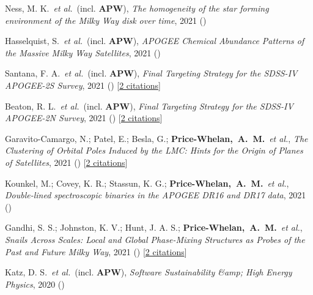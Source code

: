 \item[{\color{deemph}\scriptsize16}]Ness, M. K.~\textit{et al.}~(incl. \textbf{APW}), \textit{The homogeneity of the star forming environment of the Milky Way disk over time}, 2021 ()

\item[{\color{deemph}\scriptsize15}]Hasselquist, S.~\textit{et al.}~(incl. \textbf{APW}), \textit{APOGEE Chemical Abundance Patterns of the Massive Milky Way Satellites}, 2021 ()

\item[{\color{deemph}\scriptsize14}]Santana, F. A.~\textit{et al.}~(incl. \textbf{APW}), \textit{Final Targeting Strategy for the SDSS-IV APOGEE-2S Survey}, 2021 () [\href{http://adsabs.harvard.edu/abs/2021arXiv210811908S}{2 citations}]

\item[{\color{deemph}\scriptsize13}]Beaton, R. L.~\textit{et al.}~(incl. \textbf{APW}), \textit{Final Targeting Strategy for the SDSS-IV APOGEE-2N Survey}, 2021 () [\href{http://adsabs.harvard.edu/abs/2021arXiv210811907B}{2 citations}]

\item[{\color{deemph}\scriptsize12}]Garavito-Camargo, N.; Patel, E.; Besla, G.; \textbf{Price-Whelan,~A.~M.}~\textit{et al.}, \textit{The Clustering of Orbital Poles Induced by the LMC: Hints for the Origin of Planes of Satellites}, 2021 () [\href{http://adsabs.harvard.edu/abs/2021arXiv210807321G}{2 citations}]

\item[{\color{deemph}\scriptsize11}]Kounkel, M.; Covey, K. R.; Stassun, K. G.; \textbf{Price-Whelan,~A.~M.}~\textit{et al.}, \textit{Double-lined spectroscopic binaries in the APOGEE DR16 and DR17 data}, 2021 ()

\item[{\color{deemph}\scriptsize10}]Gandhi, S. S.; Johnston, K. V.; Hunt, J. A. S.; \textbf{Price-Whelan,~A.~M.}~\textit{et al.}, \textit{Snails Across Scales: Local and Global Phase-Mixing Structures as Probes of the Past and Future Milky Way}, 2021 () [\href{http://adsabs.harvard.edu/abs/2021arXiv210703562G}{2 citations}]

\item[{\color{deemph}\scriptsize9}]Katz, D. S.~\textit{et al.}~(incl. \textbf{APW}), \textit{Software Sustainability {\&}amp; High Energy Physics}, 2020 ()

